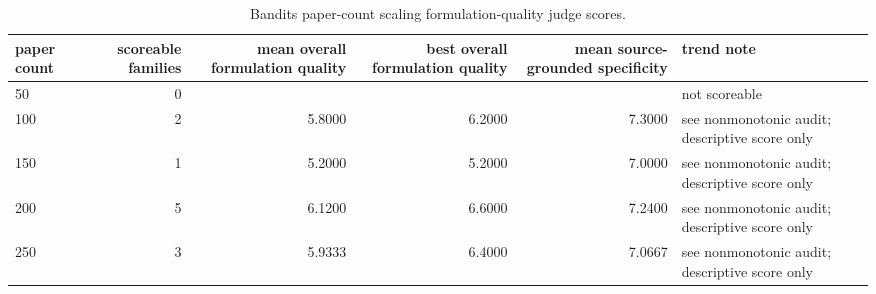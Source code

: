\begin{table}[htbp]
\centering
\caption{Bandits paper-count scaling formulation-quality judge scores.}
\label{tab:paper\_scaling\_judge}
\begin{tabular}{lrrrrl}
\toprule
paper count & scoreable families & mean overall formulation quality & best overall formulation quality & mean source-grounded specificity & trend note \\
\midrule
50 & 0 &  &  &  & not scoreable \\
100 & 2 & 5.8000 & 6.2000 & 7.3000 & see nonmonotonic audit; descriptive score only \\
150 & 1 & 5.2000 & 5.2000 & 7.0000 & see nonmonotonic audit; descriptive score only \\
200 & 5 & 6.1200 & 6.6000 & 7.2400 & see nonmonotonic audit; descriptive score only \\
250 & 3 & 5.9333 & 6.4000 & 7.0667 & see nonmonotonic audit; descriptive score only \\
\bottomrule
\end{tabular}
\end{table}

